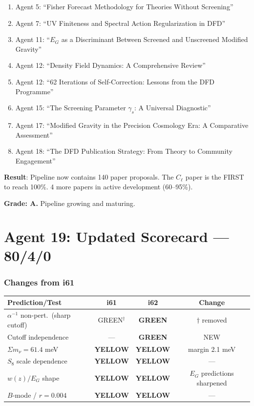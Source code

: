 \documentclass[11pt,a4paper]{article}
\newcommand{\GREEN}{\textcolor{dfdgreen}{\textbf{GREEN}}}
\newcommand{\YELLOW}{\textcolor{dfdyellow}{\textbf{YELLOW}}}
\begin{document}
\begin{enumerate}
\item Agent 5: ``Fisher Forecast Methodology for Theories Without Screening''
\item Agent 7: ``UV Finiteness and Spectral Action Regularization in DFD''
\item Agent 11: ``$E_G$ as a Discriminant Between Screened and Unscreened Modified Gravity''
\item Agent 12: ``Density Field Dynamics: A Comprehensive Review''
\item Agent 12: ``62 Iterations of Self-Correction: Lessons from the DFD Programme''
\item Agent 15: ``The Screening Parameter $\gamma_s$: A Universal Diagnostic''
\item Agent 17: ``Modified Gravity in the Precision Cosmology Era: A Comparative Assessment''
\item Agent 18: ``The DFD Publication Strategy: From Theory to Community Engagement''
\end{enumerate}

\begin{tcolorbox}[colback=green!5!white, colframe=green!60!black, title={Agent 18: 140 Paper Proposals, 1 at 100\%}]
\textbf{Result}: Pipeline now contains 140 paper proposals. The $C_\ell$ paper is the FIRST to reach 100\%. 4 more papers in active development (60--95\%).

\textbf{Grade: A.} Pipeline growing and maturing.
\end{tcolorbox}


\part{Agent 19: Updated Scorecard --- 80/4/0}
\label{part:scorecard}

\section{Changes from i61}

\begin{center}
\begin{longtable}{p{5cm}ccc}
\toprule
\textbf{Prediction/Test} & \textbf{i61} & \textbf{i62} & \textbf{Change} \\
\midrule
$\alpha^{-1}$ non-pert.\ (sharp cutoff) & GREEN$^\dagger$ & \GREEN & $\dagger$ removed \\
Cutoff independence & --- & \GREEN & NEW \\
\midrule
$\Sigma m_\nu = 61.4$ meV & \YELLOW & \YELLOW & margin 2.1 meV \\
$S_8$ scale dependence & \YELLOW & \YELLOW & --- \\
$w(z)/E_G$ shape & \YELLOW & \YELLOW & $E_G$ predictions sharpened \\
$B$-mode / $r = 0.004$ & \YELLOW & \YELLOW & --- \\
\bottomrule
\end{longtable}
\end{center}
\end{document}

